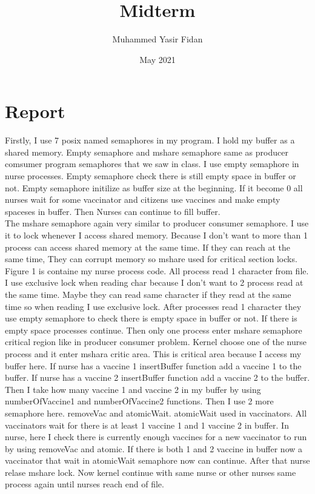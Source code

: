 \documentclass{article}
\title{Midterm}
\author{Muhammed Yasir Fidan }
\date{May 2021}
\begin{document}
\maketitle

\section{Report}
Firstly, I use 7 posix named semaphores in my program. I hold my buffer as a shared memory. Empty semaphore and mshare semaphore same as producer comsumer program semaphores that we saw in class. I use empty semaphore in nurse processes. Empty semaphore check there is still empty space in buffer or not. Empty semaphore initilize as buffer size at the beginning. If it become 0 all nurses wait for some vaccinator and citizens use vaccines and make empty spaceses in buffer. Then Nurses can continue to fill buffer. \\
The mshare semaphore again very similar to producer consumer semaphore. I use it to lock whenever I access shared memory. Because I don't want to more than 1 process can access shared memory at the same time. If they can reach at the same time, They can corrupt memory so mshare used for critical section locks. \\
Figure 1 is containe my nurse process code. All process read 1 character from file. I use exclusive lock when reading char because I don't want to 2 process read at the same time. Maybe they can read same character if they read at the same time so when reading I use exclusive lock. After processes read 1 character they use empty semaphore to check there is empty space in buffer or not. If there is empty space processes continue. Then only one process enter mshare semaphore critical region like in producer consumer problem. Kernel choose one of the nurse process and it enter mshara critic area. This is critical area because I access my buffer here. If nurse has a vaccine 1 insertBuffer function add a vaccine 1 to the buffer. If nurse has a vaccine 2 insertBuffer function add a vaccine 2 to the buffer. Then I take how many vaccine 1 and vaccine 2 in my buffer by using numberOfVaccine1 and numberOfVaccine2 functions. Then I use 2 more semaphore here. removeVac and atomicWait. atomicWait used in vaccinators. All vaccinators wait for there is at least 1 vaccine 1 and 1 vaccine 2 in buffer. In nurse, here I check there is currently enough vaccines for a new vaccinator to run by using removeVac and atomic. If there is both 1 and 2 vaccine in buffer now a vaccinator that wait in atomicWait semaphore now can continue. After that nurse relase mshare lock. Now kernel continue with same nurse or other nurses same process again until nurses reach end of file.
\end{document}
